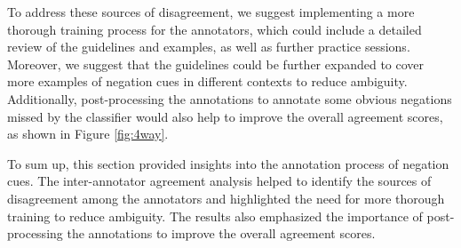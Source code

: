 To address these sources of disagreement, we suggest implementing a more thorough training process for the annotators, which could include a detailed review of the guidelines and examples, as well as further practice sessions. Moreover, we suggest that the guidelines could be further expanded to cover more examples of negation cues in different contexts to reduce ambiguity. Additionally, post-processing the annotations to annotate some obvious negations missed by the classifier would also help to improve the overall agreement scores, as shown in Figure \ref{fig:4way}.


To sum up, this section provided insights into the annotation process of negation cues. The inter-annotator agreement analysis helped to identify the sources of disagreement among the annotators and highlighted the need for more thorough training to reduce ambiguity. The results also emphasized the importance of post-processing the annotations to improve the overall agreement scores.
